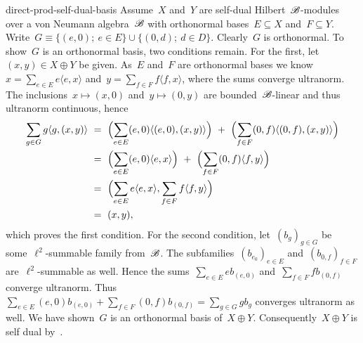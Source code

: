 \begin{solution}{direct-prod-self-dual-basis}%
    Assume~$X$ and~$Y$ are self-dual Hilbert~$\mathscr{B}$-modules over a
        von Neumann algebra~$\mathscr{B}$ with orthonormal bases~$E \subseteq X$
        and~$F \subseteq Y$.
Write~$G \equiv \{(e,0); \ e \in E\} \cup \{ (0,d); \ d \in D \}$.
Clearly~$G$ is orthonormal.
To show~$G$ is an orthonormal basis,
    two conditions remain.
For the first, let~$(x,y) \in X \oplus Y$ be given.
As~$E$ and~$F$ are orthonormal bases
    we know~$x = \sum_{e\in E} e \langle e,x\rangle$
    and~$y = \sum_{f \in F} f \langle f,x\rangle$,
    where the sums converge ultranorm.
    The inclusions~$x \mapsto (x,0)$ and~$y \mapsto (0,y)$
        are bounded~$\mathscr{B}$-linear and thus ultranorm continuous,
        hence
\begin{align*}
        \sum_{g\in G} g \langle g, (x,y)\rangle
        &\ =\  \Bigl(\sum_{e\in E}
                        (e,0) \langle (e,0), (x,y) \rangle \Bigr)  \ +\ 
                        \Bigl( \sum_{f \in F} 
                        (0,f) \langle (0,f), (x,y) \rangle \Bigr) \\
        &\ =\  \Bigl(\sum_{e\in E}
                        (e,0) \langle e, x \rangle \Bigr) \ + \ 
                        \Bigl( \sum_{f \in F} 
                        (0,f) \langle f, y \rangle \Bigr) \\
        &\ =\  \Bigl(\sum_{e \in E} e \langle e,x \rangle ,
                \sum_{f \in F} f \langle f, y \rangle  \Bigr)\\
                    & \ =\ (x,y),
\end{align*}
which proves the first condition.
    For the second condition, let~$(b_g)_{g\in G}$
    be some~$\ell^2$-summable family from~$\mathscr{B}$.
The subfamilies~$(b_{e_0})_{e \in E}$
    and~$(b_{0,f})_{f \in F}$
    are~$\ell^2$-summable as well.
Hence the
    sums~$\sum_{e \in E} e b_{(e,0)}$
    and~$\sum_{f \in F} f b_{(0,f)}$ converge ultranorm.
Thus~$\sum_{e \in E} (e,0) b_{(e,0)}
    + \sum_{f \in F} (0,f) b_{(0,f)}
    =\sum_{g \in G} g b_g$ converges ultranorm as well.
We have shown~$G$ is an orthonormal basis of~$X\oplus Y$.
Consequently~$X \oplus Y$ is self dual
    by~\sref{dils-selfdual}.
\end{solution}
